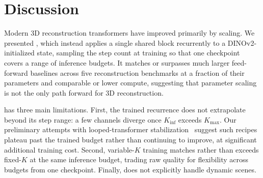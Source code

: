

\section{Discussion}
\label{sec:conclusion}

Modern 3D reconstruction transformers have improved primarily by scaling. We presented \methodname, which instead applies a single shared block recurrently to a DINOv2-initialized state, sampling the step count at training so that one checkpoint covers a range of inference budgets. It matches or surpasses much larger feed-forward baselines across five reconstruction benchmarks at a fraction of their parameters and comparable or lower compute, suggesting that parameter scaling is not the only path forward for 3D reconstruction.

\methodname{} has three main limitations\label{sec:limitations}. First, the trained recurrence does not extrapolate beyond its step range: a few channels diverge once $K_\text{inf}$ exceeds $K_\text{max}$. Our preliminary attempts with looped-transformer stabilization~\citep{yang2024looped} suggest such recipes plateau past the trained budget rather than continuing to improve, at significant additional training cost. Second, variable-$K$ training matches rather than exceeds fixed-$K$ at the same inference budget, trading raw quality for flexibility across budgets from one checkpoint. Finally, \methodname{} does not explicitly handle dynamic scenes.
